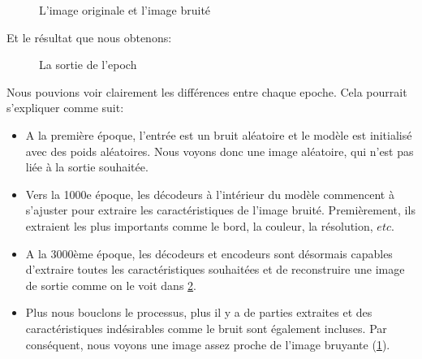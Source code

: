 \documentclass[
  12pt,
  dvipsnames]{article}
\providecommand{\tightlist}{%
  \setlength{\itemsep}{0pt}\setlength{\parskip}{0pt}}
\begin{document}
\begin{figure}

{\centering {}

}

\caption{L'image originale et l'image bruité}\label{fig:noisy-original-image}
\end{figure}

Et le résultat que nous obtenons:

\begin{figure}

{\centering {}

}

\caption{La sortie de l'epoch}\label{fig:model-epoch-output}
\end{figure}

Nous pouvions voir clairement les différences entre chaque epoche. Cela pourrait s'expliquer comme suit:

\begin{itemize}
\tightlist
\item
  A la première époque, l'entrée est un bruit aléatoire et le modèle est initialisé avec des poids aléatoires. Nous voyons donc une image aléatoire, qui n'est pas liée à la sortie souhaitée.
\item
  Vers la 1000e époque, les décodeurs à l'intérieur du modèle commencent à s'ajuster pour extraire les caractéristiques de l'image bruité. Premièrement, ils extraient les plus importants comme le bord, la couleur, la résolution, \(etc.\)
\item
  A la 3000ème époque, les décodeurs et encodeurs sont désormais capables d'extraire toutes les caractéristiques souhaitées et de reconstruire une image de sortie comme on le voit dans \ref{fig:model-epoch-output}.
\item
  Plus nous bouclons le processus, plus il y a de parties extraites et des caractéristiques indésirables comme le bruit sont également incluses. Par conséquent, nous voyons une image assez proche de l'image bruyante (\ref{fig:noisy-original-image}).
\end{itemize}
\end{document}
